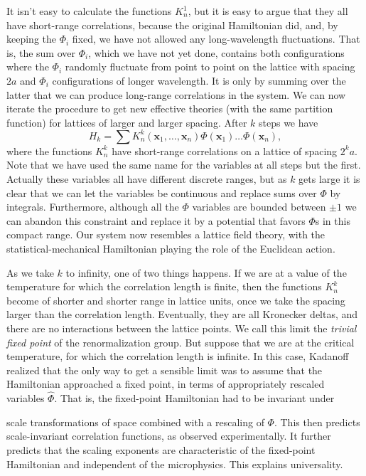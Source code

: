 It isn't easy to calculate the functions $K_n^1$, but it is easy to argue that
they all have short-range correlations, because the original Hamiltonian did,
and, by keeping the $\Phi_i$ fixed, we have not allowed any long-wavelength
fluctuations. That is, the sum over $\Phi_i$, which we have not yet done,
contains both configurations where the $\Phi_i$ randomly fluctuate from point
to point on the lattice with spacing $2a$ and $\Phi_i$ configurations of
longer wavelength. It is only by summing over the latter that we can produce
long-range correlations in the system. We can now iterate the procedure to get
new effective theories (with the same partition function) for lattices of
larger and larger spacing. After $k$ steps we have
\[
  H_k=\sum K_n^k(\mathbf x_1,\ldots,\mathbf x_n)
  \Phi(\mathbf x_1)\ldots\Phi(\mathbf x_n),
\]
where the functions $K_n^k$ have short-range correlations on a lattice of
spacing $2^ka$. Note that we have used the same name for the variables at all
steps but the first. Actually these variables all have different discrete
ranges, but as $k$ gets large it is clear that we can let the variables be
continuous and replace sums over $\Phi$ by integrals. Furthermore, although
all the $\Phi$ variables are bounded between $\pm1$ we can abandon this
constraint and replace it by a potential that favors $\Phi$s in this compact
range. Our system now resembles a lattice field theory, with the
statistical-mechanical Hamiltonian playing the role of the Euclidean action.


As we take $k$ to infinity, one of two things happens. If we are at a value of
the temperature for which the correlation length is finite, then the functions
$K_n^k$ become of shorter and shorter range in lattice units, once we take the
spacing larger than the correlation length. Eventually, they are all
Kronecker deltas, and there are no interactions between the lattice points. We
call this limit the \emph{trivial fixed point} of the renormalization group.
But suppose that we are at the critical temperature, for which the correlation
length is infinite. In this case, Kadanoff realized that the only way to get a
sensible limit was to assume that the Hamiltonian approached a fixed point, in
terms of appropriately rescaled variables $\hat\Phi$. That is, the fixed-point
Hamiltonian had to be invariant under

scale transformations of space combined with a rescaling of $\Phi$. This then
predicts scale-invariant correlation functions, as observed experimentally. It
further predicts that the scaling exponents are characteristic of the
fixed-point Hamiltonian and independent of the microphysics. This explains
universality.

